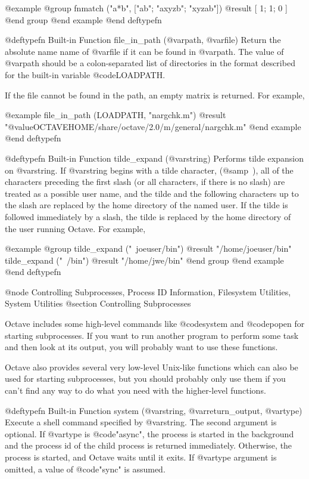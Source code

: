 {{@example
@group
fnmatch ("a*b", ["ab"; "axyzb"; "xyzab"])
     @result{} [ 1; 1; 0 ]
@end group
@end example
@end deftypefn

@deftypefn {Built-in Function} {} file_in_path (@var{path}, @var{file})
Return the absolute name name of @var{file} if it can be found in
@var{path}.  The value of @var{path} should be a colon-separated list of
directories in the format described for the built-in variable
@code{LOADPATH}.

If the file cannot be found in the path, an empty matrix is returned.
For example,

@example
file_in_path (LOADPATH, "nargchk.m")
     @result{} "@value{OCTAVEHOME}/share/octave/2.0/m/general/nargchk.m"
@end example
@end deftypefn

@deftypefn {Built-in Function} {} tilde_expand (@var{string})
Performs tilde expansion on @var{string}.  If @var{string} begins with a
tilde character, (@samp{~}), all of the characters preceding the first
slash (or all characters, if there is no slash) are treated as a
possible user name, and the tilde and the following characters up to the
slash are replaced by the home directory of the named user.  If the
tilde is followed immediately by a slash, the tilde is replaced by the
home directory of the user running Octave.  For example,

@example
@group
tilde_expand ("~joeuser/bin")
     @result{} "/home/joeuser/bin"
tilde_expand ("~/bin")
     @result{} "/home/jwe/bin"
@end group
@end example
@end deftypefn

@node Controlling Subprocesses, Process ID Information, Filesystem Utilities, System Utilities
@section Controlling Subprocesses

Octave includes some high-level commands like @code{system} and
@code{popen} for starting subprocesses.  If you want to run another
program to perform some task and then look at its output, you will
probably want to use these functions.

Octave also provides several very low-level Unix-like functions which
can also be used for starting subprocesses, but you should probably only
use them if you can't find any way to do what you need with the
higher-level functions.

@deftypefn {Built-in Function} {} system (@var{string}, @var{return_output}, @var{type})
Execute a shell command specified by @var{string}.  The second argument is optional.
If @var{type} is @code{"async"}, the process is started in the
background and the process id of the child process is returned
immediately.  Otherwise, the process is started, and Octave waits until
it exits.  If @var{type} argument is omitted, a value of @code{"sync"}
is assumed.

}}
